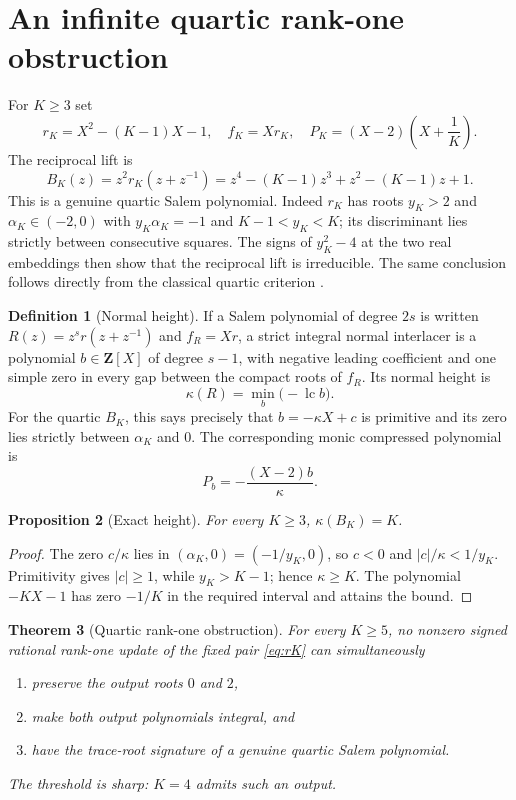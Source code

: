 \documentclass[11pt,reqno]{amsart}
\newtheorem{theorem}{Theorem}[section]
\newtheorem{proposition}[theorem]{Proposition}
\theoremstyle{definition}
\newtheorem{definition}[theorem]{Definition}
\theoremstyle{remark}
\newcommand{\Z}{\mathbf Z}
\begin{document}
\section{An infinite quartic rank-one obstruction}

For $K\geq3$ set
\begin{equation}\label{eq:rK}
 r_K=X^2-(K-1)X-1,\quad f_K=Xr_K,\quad
 P_K=(X-2)\left(X+\frac1K\right).
\end{equation}
The reciprocal lift is
\begin{equation}\label{eq:BK}
 B_K(z)=z^2r_K(z+z^{-1})
 =z^4-(K-1)z^3+z^2-(K-1)z+1.
\end{equation}
This is a genuine quartic Salem polynomial.  Indeed $r_K$ has roots
$y_K>2$ and $\alpha_K\in(-2,0)$ with $y_K\alpha_K=-1$ and
$K-1<y_K<K$; its discriminant lies strictly between consecutive squares.
The signs of $y_K^2-4$ at the two real embeddings then show that the
reciprocal lift is irreducible.  The same conclusion follows directly from
the classical quartic criterion \cite{zaimi}.

\begin{definition}[Normal height]
If a Salem polynomial of degree $2s$ is written
$R(z)=z^sr(z+z^{-1})$ and $f_R=Xr$, a strict integral normal interlacer is a
polynomial $b\in\Z[X]$ of degree $s-1$, with negative leading coefficient and
one simple zero in every gap between the compact roots of $f_R$.  Its normal
height is
\[
 \kappa(R)=\min_b\bigl(-\operatorname{lc}b\bigr).
\]
For the quartic $B_K$, this says precisely that $b=-\kappa X+c$ is primitive
and its zero lies strictly between $\alpha_K$ and $0$.
The corresponding monic compressed polynomial is
\begin{equation}\label{eq:normalbridge}
 P_b=-\frac{(X-2)b}{\kappa}.
\end{equation}
\end{definition}

\begin{proposition}[Exact height]\label{prop:exactheight}
For every $K\geq3$, $\kappa(B_K)=K$.
\end{proposition}

\begin{proof}
The zero $c/\kappa$ lies in $(\alpha_K,0)=(-1/y_K,0)$, so $c<0$ and
$|c|/\kappa<1/y_K$.  Primitivity gives $|c|\geq1$, while $y_K>K-1$;
hence $\kappa\geq K$.  The polynomial $-KX-1$ has zero $-1/K$ in the
required interval and attains the bound.
\end{proof}

\begin{theorem}[Quartic rank-one obstruction]\label{thm:quarticobstruction}
For every $K\geq5$, no nonzero signed rational rank-one update of the fixed
pair \eqref{eq:rK} can simultaneously
\begin{enumerate}[label=\textup{(\roman*)}]
\item preserve the output roots $0$ and $2$,
\item make both output polynomials integral, and
\item have the trace-root signature of a genuine quartic Salem polynomial.
\end{enumerate}
The threshold is sharp: $K=4$ admits such an output.
\end{theorem}
\end{document}
